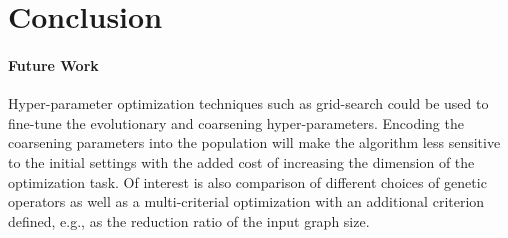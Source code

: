 \section{Conclusion}

\paragraph{Future Work} Hyper-parameter optimization techniques such as grid-search could be used to fine-tune the evolutionary and coarsening hyper-parameters. Encoding the coarsening parameters into the population will make the algorithm less sensitive to the initial settings with the added cost of increasing the dimension of the optimization task. Of interest is also comparison of different choices of genetic operators as well as a multi-criterial optimization with an additional criterion defined, e.g., as the reduction ratio of the input graph size.
